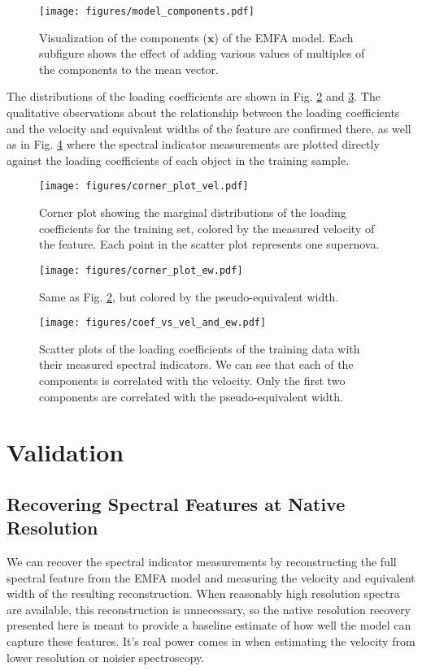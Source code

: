 \begin{figure}[!htb]
    \centering
    \texttt{[image: figures/model\_components.pdf]}
    \caption{Visualization of the components ($\bm{x}$) of the EMFA model. Each subfigure shows the effect of adding various values of multiples of the components to the mean vector.}
    \label{emfa_components}
\end{figure}

The distributions of the loading coefficients are shown in Fig. \ref{corner_plot_vel} and \ref{corner_plot_ew}. The qualitative observations about the relationship between the loading coefficients and the velocity and equivalent widths of the feature are confirmed there, as well as in Fig. \ref{scatter_loading} where the spectral indicator measurements are plotted directly against the loading coefficients of each object in the training sample.

\begin{figure}[!htb]
    \centering
    \texttt{[image: figures/corner\_plot\_vel.pdf]}
    \caption{Corner plot showing the marginal distributions of the loading coefficients for the training set, colored by the measured velocity of the \siliconii\; feature. Each point in the scatter plot represents one supernova.}
    \label{corner_plot_vel}
\end{figure}

\begin{figure}[!htb]
    \centering
    \texttt{[image: figures/corner\_plot\_ew.pdf]}
    \caption{Same as Fig. \ref{corner_plot_vel}, but colored by the pseudo-equivalent width.}
    \label{corner_plot_ew}
\end{figure}

\begin{figure}[!htb]
    \centering
    \texttt{[image: figures/coef\_vs\_vel\_and\_ew.pdf]}
    \caption{Scatter plots of the loading coefficients of the training data with their measured spectral indicators. We can see that each of the components is correlated with the velocity. Only the first two components are correlated with the pseudo-equivalent width.}
    \label{scatter_loading}
\end{figure}

\section{Validation}
\label{validation}

\subsection{Recovering Spectral Features at Native Resolution}
\label{snf_validation}
We can recover the spectral indicator measurements by reconstructing the full spectral feature from the EMFA model and measuring the velocity and equivalent width of the resulting reconstruction. When reasonably high resolution spectra are available, this reconstruction is unnecessary, so the native resolution recovery presented here is meant to provide a baseline estimate of how well the model can capture these features. It's real power comes in when estimating the velocity from lower resolution or noisier spectroscopy.

